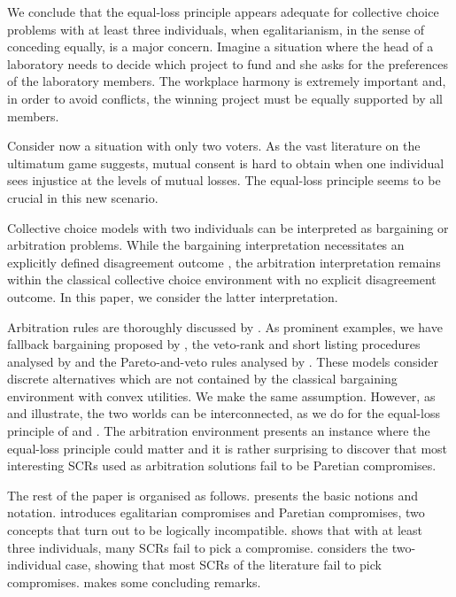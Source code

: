 We conclude that the equal-loss principle appears adequate for collective choice problems with at least three individuals, when egalitarianism, in the sense of conceding equally, is a major concern. Imagine a situation where the head of a laboratory needs to decide which project to fund and she asks for the preferences of the laboratory members. The workplace harmony is extremely important and, in order to avoid conflicts, the winning project must be equally supported by all members. 

Consider now a situation with only two voters. As the vast literature on the ultimatum game \citep{Werner2014} suggests, mutual consent is hard to obtain when one individual sees injustice at the levels of mutual losses. The equal-loss principle seems to be crucial in this new scenario.

Collective choice models with two individuals can be interpreted as bargaining or arbitration problems. While the bargaining interpretation necessitates an explicitly defined disagreement outcome \citep{Kibris2007}, the arbitration interpretation \citep{Sprumont1993} remains within the classical collective choice environment with no explicit disagreement outcome. In this paper, we consider the latter interpretation. 

Arbitration rules are thoroughly discussed by \citet{Barbera2020}. As prominent examples, we have fallback bargaining proposed by \citet{Brams2001}, the veto-rank and short listing procedures analysed by \citet{Clippel2014} and the Pareto-and-veto rules analysed by \citet{Laslier2020}. These models consider discrete alternatives which are not contained by the classical \citet{Nash1950} bargaining environment with convex utilities. We make the same assumption. However, as \citet{Mariotti1998} and \citet{Nagahisa2002} illustrate, the two worlds can be interconnected, as we do for the equal-loss principle of \citet{Chun1988} and \citet{Chun1991}. The arbitration environment presents an instance where the equal-loss principle could matter and it is rather surprising to discover that most interesting \acp{SCR} used as arbitration solutions fail to be Paretian compromises. 

The rest of the paper is organised as follows.  presents the basic notions and notation.  introduces egalitarian compromises and Paretian compromises, two concepts that turn out to be logically incompatible.  shows that with at least three individuals, many \acp{SCR} fail to pick a compromise.  considers the two-individual case, showing that most \acp{SCR} of the literature fail to pick compromises.  makes some concluding remarks. 

